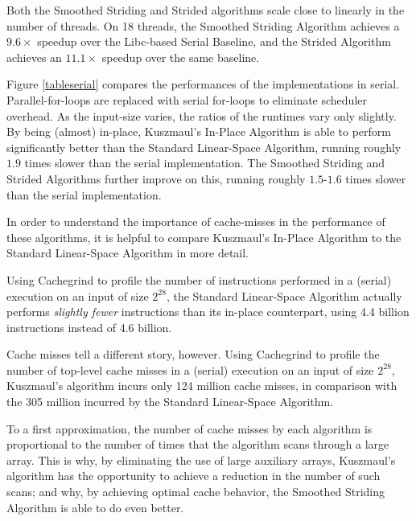 \documentclass[11pt]{article}
\renewcommand{\paragraph}[1]{\vspace{0.09in}\noindent{\bf \boldmath #1.}}
\theoremstyle{remark}
\theoremstyle{remark}
\begin{document}
Both the Smoothed Striding and Strided algorithms scale close to
linearly in the number of threads. On 18 threads, the Smoothed
Striding Algorithm achieves a $9.6 \times $ speedup over the
Libc-based Serial Baseline, and the Strided Algorithm achieves an
$11.1 \times$ speedup over the same baseline.

Figure \ref{tableserial} compares the performances of the
implementations in serial. Parallel-for-loops are replaced with serial
for-loops to eliminate scheduler overhead. As the input-size varies,
the ratios of the runtimes vary only slightly. By being (almost)
in-place, Kuszmaul's In-Place Algorithm is able to perform
significantly better than the Standard Linear-Space Algorithm, running
roughly $1.9$ times slower than the serial implementation. The
Smoothed Striding and Strided Algorithms further improve on this,
running roughly $1.5$-$1.6$ times slower than the serial
implementation. 

\paragraph{Understanding the bottleneck: cache-misses}
In order to understand the importance of cache-misses in the
performance of these algorithms, it is helpful to compare Kuszmaul's
In-Place Algorithm to the Standard Linear-Space Algorithm in more
detail.

Using Cachegrind to profile the number of instructions performed in a
(serial) execution on an input of size $2^{28}$, the Standard
Linear-Space Algorithm actually performs \emph{slightly fewer}
instructions than its in-place counterpart, using 4.4 billion
instructions instead of 4.6 billion.

Cache misses tell a different story, however. Using Cachegrind to
profile the number of top-level cache misses in a (serial) execution
on an input of size $2^{28}$, Kuszmaul's algorithm incurs
only 124 million cache misses, in comparison with the 305 million
incurred by the Standard Linear-Space Algorithm. 

To a first approximation, the number of cache misses by each algorithm
is proportional to the number of times that the algorithm scans
through a large array. This is why, by eliminating the use of large
auxiliary arrays, Kuszmaul's algorithm has the
opportunity to achieve a reduction in the number of such scans; and
why, by achieving optimal cache behavior, the Smoothed Striding
Algorithm is able to do even better.
\end{document}
